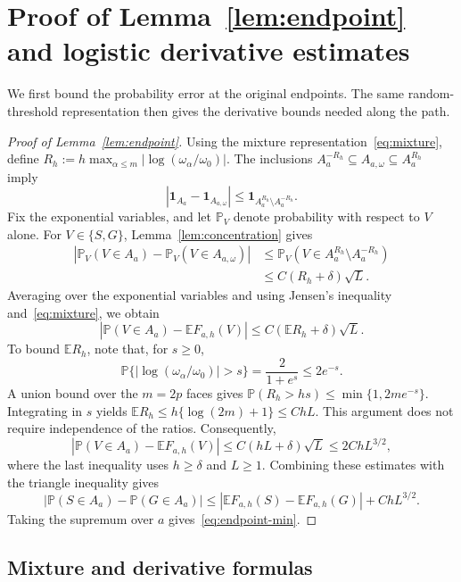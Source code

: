 \documentclass[11pt,letterpaper]{article}
\newenvironment{recovered}{}{}
\theoremstyle{remark}
\newcommand{\E}{\mathbb E}
\newcommand{\Pp}{\mathbb P}
\newcommand{\ind}{\mathbf 1}
\begin{document}
\section{Proof of Lemma~\ref*{lem:endpoint} and logistic derivative estimates}\label{appx-sec:smoothing}
We first bound the probability error at the original endpoints.
The same random-threshold representation then gives the derivative
bounds needed along the path.
\begin{proof}[Proof of Lemma~\ref{lem:endpoint}]
\begin{recovered}
Using the mixture representation~\eqref{eq:mixture}, {define}
\(R_h:=h\max_{\alpha\le m}|\log(\omega_\alpha/\omega_0)|\).
The inclusions \(A_a^{-R_h}\subseteq A_{a,\omega}\subseteq A_a^{R_h}\)
imply
\[
 |\ind_{A_a}-\ind_{A_{a,\omega}}|
 \le\ind_{A_a^{R_h}\setminus A_a^{-R_h}}.
\]
Fix the exponential variables, and let \(\Pp_V\) denote probability
with respect to \(V\) alone. For \(V\in\{S,G\}\),
Lemma~\ref{lem:concentration} gives
\[
 \begin{aligned}
 |\Pp_V(V\in A_a)-\Pp_V(V\in A_{a,\omega})|
 &\le\Pp_V(V\in A_a^{R_h}\setminus A_a^{-R_h})\\
 &\le C(R_h+\delta)\sqrt L.
 \end{aligned}
\]
Averaging over the exponential variables and using Jensen's inequality
and~\eqref{eq:mixture}, we obtain
\[
 |\Pp(V\in A_a)-\E F_{a,h}(V)|
 \le C(\E R_h+\delta)\sqrt L.
\]
To bound \(\E R_h\), note that, for \(s\ge0\),
\[
 \Pp\{|\log(\omega_\alpha/\omega_0)|>s\}
 =\frac2{1+e^s}\le2e^{-s}.
\]
A union bound over the \(m=2p\) faces gives
\(\Pp(R_h>hs)\le\min\{1,2me^{-s}\}\). Integrating in \(s\)
yields \(\E R_h\le h\{\log(2m)+1\}\le ChL\). This argument
does not require independence of the ratios. Consequently,
\[
 |\Pp(V\in A_a)-\E F_{a,h}(V)|
 \le C(hL+\delta)\sqrt L\le2ChL^{3/2},
\]
where the last inequality uses \(h\ge\delta\) and \(L\ge1\).
Combining these estimates with the triangle inequality gives
\[
 |\Pp(S\in A_a)-\Pp(G\in A_a)|
 \le|\E F_{a,h}(S)-\E F_{a,h}(G)|+ChL^{3/2}.
\]
Taking the supremum over \(a\) gives~\eqref{eq:endpoint-min}.
\end{recovered}
\end{proof}

\subsection{\texorpdfstring{Mixture and derivative formulas}{Mixture and derivative formulas}}\label{appx-sec:mixture}
\end{document}
